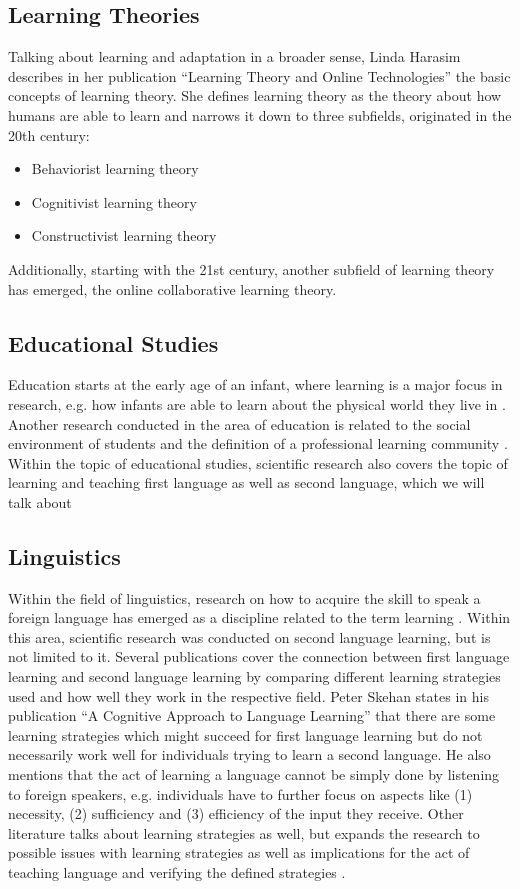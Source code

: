 \documentclass[conference]{IEEEtran}
\begin{document}
	\subsection{Learning Theories}\label{LT}
		Talking about learning and adaptation in a broader sense, Linda Harasim describes in her publication “Learning Theory and Online Technologies” \cite{d1} the basic concepts of learning theory. She defines learning theory as the theory about how humans are able to learn and narrows it down to three subfields, originated in the 20th century:
		\begin{itemize}
			\item Behaviorist learning theory
			\item Cognitivist learning theory
			\item Constructivist learning theory
		\end{itemize}

		Additionally, starting with the 21st century, another subfield of learning theory has emerged, the online collaborative learning theory.

	\subsection{Educational Studies}\label{ES}
		Education starts at the early age of an infant, where learning is a major focus in research, e.g. how infants are able to learn about the physical world they live in \cite{d2}. Another research conducted in the area of education is related to the social environment of students and the definition of a professional learning community \cite{d3}. Within the topic of educational studies, scientific research also covers the topic of learning and teaching first language as well as second language, which we will talk about

	\subsection{Linguistics}\label{Li}
		Within the field of linguistics, research on how to acquire the skill to speak a foreign language has emerged as a discipline related to the term learning \cite{d4}. Within this area, scientific research was conducted on second language learning, but is not limited to it. Several publications cover the connection between first language learning and second language learning by comparing different learning strategies used and how well they work in the respective field. Peter Skehan states in his publication ``A Cognitive Approach to Language Learning'' \cite{d5} that there are some learning strategies which might succeed for first language learning but do not necessarily work well for individuals trying to learn a second language. He also mentions that the act of learning a language cannot be simply done by listening to foreign speakers, e.g. individuals have to further focus on aspects like (1) necessity, (2) sufficiency and (3) efficiency of the input they receive. Other literature talks about learning strategies as well, but expands the research to possible issues with learning strategies as well as implications for the act of teaching language and verifying the defined strategies \cite{d6}.
\end{document}
